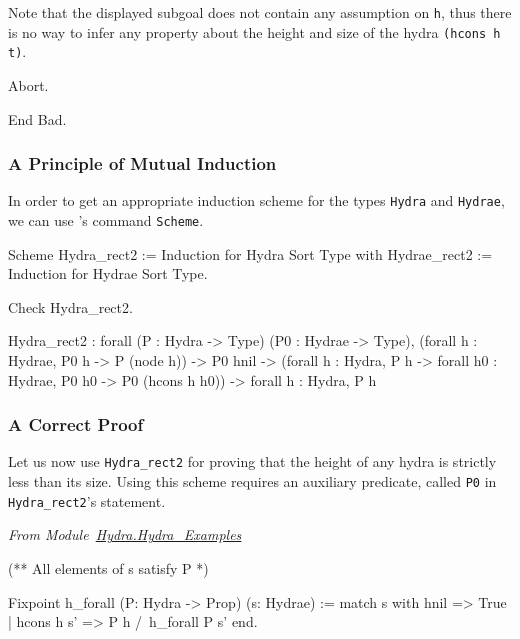 Note that the displayed subgoal does not contain any assumption on \texttt{h}, thus there is no way to 
infer any property about the height and size of the hydra \texttt{(hcons h t)}.

\begin{Coqbad}
Abort.

End Bad.
\end{Coqbad}

\subsubsection{A Principle of Mutual Induction}
In order to get an appropriate induction scheme for the types 
\texttt{Hydra} and \texttt{Hydrae}, we can use  \coq{}'s  command \texttt{Scheme}.



\begin{Coqsrc}
Scheme Hydra_rect2 := Induction for Hydra Sort Type
with Hydrae_rect2 := Induction for Hydrae Sort Type.
\end{Coqsrc}  


\begin{Coqsrc}
Check Hydra_rect2.
\end{Coqsrc}


\begin{Coqanswer}
Hydra_rect2
 : forall (P : Hydra -> Type) (P0 : Hydrae -> Type),
   (forall h : Hydrae, P0 h -> P (node h)) ->
    P0 hnil ->
    (forall h : Hydra, P h -> 
             forall h0 : Hydrae, P0 h0 -> P0 (hcons h h0)) ->
    forall h : Hydra, P h
\end{Coqanswer}  




\subsubsection{A Correct Proof}

Let us now use \texttt{Hydra\_rect2} for proving that the height of any hydra is strictly less than its size.
Using this scheme requires an auxiliary predicate, called \texttt{P0} in \texttt{Hydra\_rect2}'s statement. 

\vspace{4pt}
\noindent
\emph{From Module~\href{../theories/html/hydras.Hydra.Hydra_Examples.html}{Hydra.Hydra\_Examples}}

\begin{Coqsrc}
(** All elements of s satisfy P *)

Fixpoint h_forall (P: Hydra -> Prop) (s: Hydrae) :=
  match s with
      hnil => True
    | hcons h s' => P h /\ h_forall P s'
  end.
 \end{Coqsrc}

